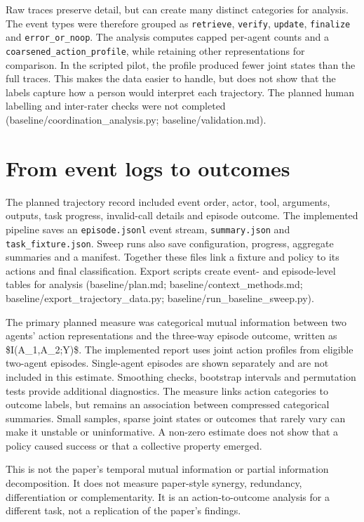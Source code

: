 \documentclass[12pt,a4paper,oneside]{report}
\begin{document}
Raw traces preserve detail, but can create many distinct categories for analysis. The event types were therefore grouped as \texttt{retrieve}, \texttt{verify}, \texttt{update}, \texttt{finalize} and \texttt{error\allowbreak\_or\allowbreak\_noop}. The analysis computes capped per-agent counts and a \texttt{coarsened\allowbreak\_action\allowbreak\_profile}, while retaining other representations for comparison. In the scripted pilot, the profile produced fewer joint states than the full traces. This makes the data easier to handle, but does not show that the labels capture how a person would interpret each trajectory. The planned human labelling and inter-rater checks were not completed (baseline/coordination\allowbreak\_analysis.py; baseline/validation.md).

\section{From event logs to outcomes}
The planned trajectory record included event order, actor, tool, arguments, outputs, task progress, invalid-call details and episode outcome. The implemented pipeline saves an \texttt{episode.jsonl} event stream, \texttt{summary.json} and \texttt{task\allowbreak\_fixture.json}. Sweep runs also save configuration, progress, aggregate summaries and a manifest. Together these files link a fixture and policy to its actions and final classification. Export scripts create event- and episode-level tables for analysis (baseline/plan.md; baseline/context\allowbreak\_methods.md; baseline/export\allowbreak\_trajectory\allowbreak\_data.py; baseline/run\allowbreak\_baseline\allowbreak\_sweep.py).

The primary planned measure was categorical mutual information between two agents’ action representations and the three-way episode outcome, written as \$I(A\allowbreak\_1,A\allowbreak\_2;Y)\$. The implemented report uses joint action profiles from eligible two-agent episodes. Single-agent episodes are shown separately and are not included in this estimate. Smoothing checks, bootstrap intervals and permutation tests provide additional diagnostics. The measure links action categories to outcome labels, but remains an association between compressed categorical summaries. Small samples, sparse joint states or outcomes that rarely vary can make it unstable or uninformative. A non-zero estimate does not show that a policy caused success or that a collective property emerged.

This is not the paper’s temporal mutual information or partial information decomposition. It does not measure paper-style synergy, redundancy, differentiation or complementarity. It is an action-to-outcome analysis for a different task, not a replication of the paper’s findings.
\end{document}
